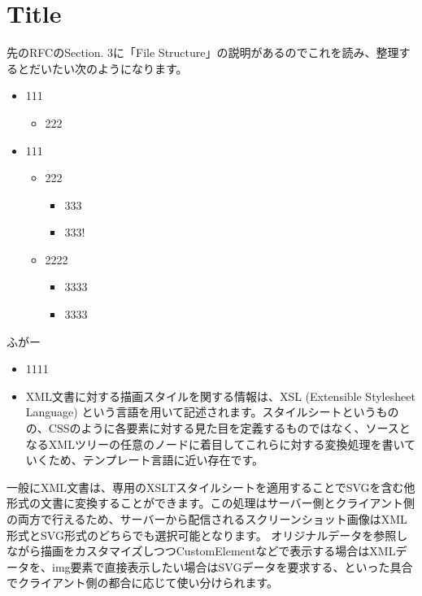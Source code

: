 \section{Title}
先のRFCのSection. 3に「File Structure」の説明があるのでこれを読み、整理するとだいたい次のようになります。
\begin{itemize}
  \item 111
  \begin{itemize}
    \item 222
  \end{itemize}
  \item 111
  \begin{itemize}
    \item 222
    \begin{itemize}
      \item 333
      \item 333!
    \end{itemize}
    \item 2222
    \begin{itemize}
      \item 3333
      \item 3333
    \end{itemize}
  \end{itemize}
\end{itemize}

ふがー
\begin{itemize}
  \item 1111
  \item XML文書に対する描画スタイルを関する情報は、XSL (Extensible Stylesheet Language) という言語を用いて記述されます。スタイルシートというものの、CSSのように各要素に対する見た目を定義するものではなく、ソースとなるXMLツリーの任意のノードに着目してこれらに対する変換処理を書いていくため、テンプレート言語に近い存在です。
\end{itemize}

一般にXML文書は、専用のXSLTスタイルシートを適用することでSVGを含む他形式の文書に変換することができます。この処理はサーバー側とクライアント側の両方で行えるため、サーバーから配信されるスクリーンショット画像はXML形式とSVG形式のどちらでも選択可能となります。
オリジナルデータを参照しながら描画をカスタマイズしつつCustomElementなどで表示する場合はXMLデータを、img要素で直接表示したい場合はSVGデータを要求する、といった具合でクライアント側の都合に応じて使い分けられます。\\

